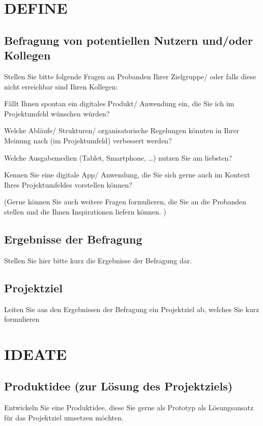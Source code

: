 \section{DEFINE}\label{DEFINE}


\subsection{Befragung von potentiellen Nutzern und/oder Kollegen}\label{Befragung von potentiellen Nutzern und/oder Kollegen}
Stellen Sie bitte folgende Fragen an Probanden Ihrer Zielgruppe/ oder falls diese nicht erreichbar sind Ihren Kollegen:

Fällt Ihnen spontan ein digitales Produkt/ Anwendung ein, die Sie ich im {Projektumfeld} wünschen würden?

Welche Abläufe/ Strukturen/ organisatorische Regelungen könnten in Ihrer Meinung nach (im Projektumfeld) verbessert werden?

Welche Ausgabemedien (Tablet, Smartphone, …) nutzen Sie am liebsten?

Kennen Sie eine digitale App/ Anwendung, die Sie sich gerne auch im Kontext {Ihres Projektumfeldes} vorstellen können?

(Gerne können Sie auch weitere Fragen formulieren, die Sie an die Probanden stellen und die Ihnen Inspirationen liefern können. )


\subsection{Ergebnisse der Befragung}\label{Ergebnisse der Befragung}
Stellen Sie hier bitte kurz die Ergebnisse der Befragung dar.

\subsection{Projektziel}\label{Projektziel}
Leiten Sie aus den Ergebnissen der Befragung ein Projektziel ab, welches Sie kurz formulieren


\section{IDEATE}\label{IDEATE}


\subsection{Produktidee (zur Lösung des Projektziels)}\label{Produktidee (zur Lösung des Projektziels) }
Entwickeln Sie eine Produktidee, diese Sie gerne als Prototyp als Lösungsansatz für das Projektziel umsetzen möchten.

